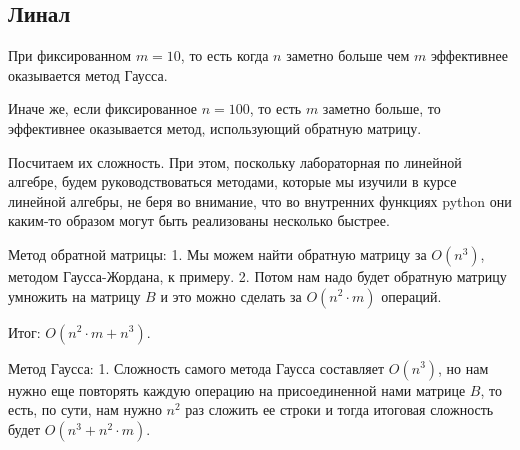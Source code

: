 	\subsection{Линал}
	При фиксированном $m=10$, то есть когда $n$ заметно больше чем $m$ эффективнее оказывается метод Гаусса. 
	
	Иначе же, если фиксированное $n = 100$, то есть $m$ заметно больше, то эффективнее оказывается метод, использующий обратную матрицу. 
	
	Посчитаем их сложность. При этом, поскольку лабораторная по линейной алгебре, будем руководствоваться методами, которые мы изучили в курсе линейной алгебры, не беря во внимание, что во внутренних функциях python они каким-то образом могут быть реализованы несколько быстрее. 
	
	Метод обратной матрицы: 
	1. Мы можем найти обратную матрицу за $O(n^3)$, методом Гаусса-Жордана, к примеру. 
	2. Потом нам надо будет обратную матрицу умножить на матрицу $B$ и это можно сделать за $O(n^2 \cdot m)$ операций.
	
	Итог: $O(n^2 \cdot m + n^3).$ 
	
	Метод Гаусса: 
	1. Сложность самого метода Гаусса составляет $O(n^3)$, но нам нужно еще повторять каждую операцию на присоединенной нами матрице $B$, то есть, по сути, нам нужно $n^2$ раз сложить ее строки и тогда итоговая сложность будет $O(n^3 + n^2 \cdot m)$.
